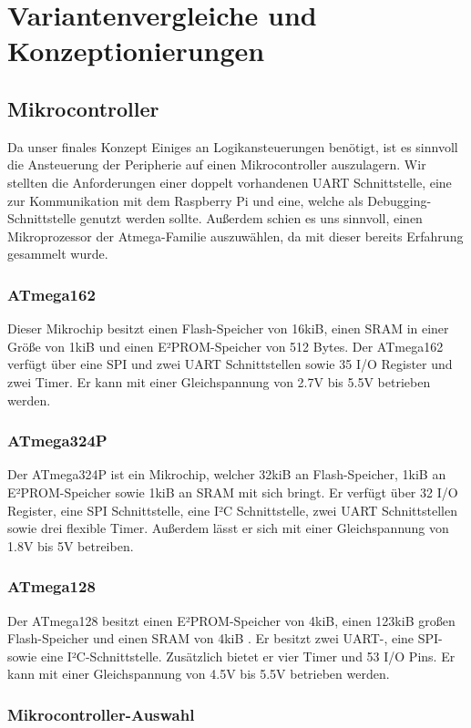 \section{Variantenvergleiche und Konzeptionierungen}
\subsection{Mikrocontroller}
Da unser finales Konzept Einiges an Logikansteuerungen benötigt, ist es sinnvoll die Ansteuerung der Peripherie auf einen Mikrocontroller auszulagern.
Wir stellten die Anforderungen einer doppelt vorhandenen UART Schnittstelle, eine zur Kommunikation mit dem Raspberry Pi und eine, welche als Debugging-Schnittstelle genutzt werden sollte.
Außerdem schien es uns sinnvoll, einen Mikroprozessor der Atmega-Familie auszuwählen, da mit dieser bereits Erfahrung gesammelt wurde.
\subsubsection{ATmega162}
Dieser Mikrochip besitzt einen Flash-Speicher von 16kiB, einen SRAM in einer Größe von 1kiB und einen E²PROM-Speicher von 512 Bytes.
Der ATmega162 verfügt über eine SPI und zwei UART Schnittstellen sowie 35 I/O Register und zwei Timer.
Er kann mit einer Gleichspannung von 2.7V bis 5.5V betrieben werden.
\subsubsection{ATmega324P}
Der ATmega324P ist ein Mikrochip, welcher 32kiB an Flash-Speicher, 1kiB an E²PROM-Speicher sowie 1kiB an SRAM mit sich bringt.
Er verfügt über 32 I/O Register, eine SPI Schnittstelle, eine I²C Schnittstelle, zwei UART Schnittstellen sowie drei flexible Timer.
Außerdem lässt er sich mit einer Gleichspannung von 1.8V bis 5V betreiben.
\subsubsection{ATmega128}
Der ATmega128 besitzt einen E²PROM-Speicher von 4kiB, einen 123kiB großen Flash-Speicher und einen SRAM von 4kiB .
Er besitzt zwei UART-, eine SPI- sowie eine I²C-Schnittstelle.
Zusätzlich bietet er vier Timer und 53 I/O Pins.
Er kann mit einer Gleichspannung von 4.5V bis 5.5V betrieben werden.
\subsubsection{Mikrocontroller-Auswahl}

